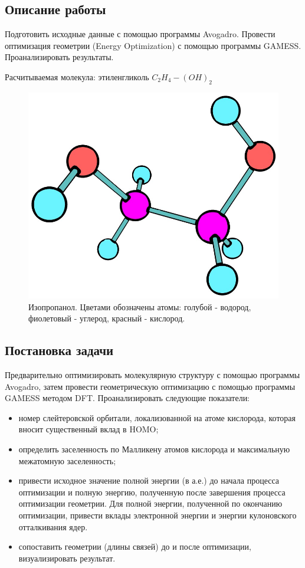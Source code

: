 \subsection{Описание работы}
Подготовить исходные данные с помощью программы Avogadro. Провести оптимизация геометрии (Energy Optimization) с помощью программы GAMESS. Проанализировать результаты.

Расчитываемая молекула: этиленгликоль $C_2H_4 - (OH)_2$

\begin{figure}[H]
\centering
\captionsetup{justification=centering}
\includegraphics[scale=0.4]{fig/0.jpg}
\caption{Изопропанол. Цветами обозначены атомы: голубой - водород, фиолетовый - углерод, красный - кислород.}
\end{figure}


\subsection{Постановка задачи}
Предварительно оптимизировать молекулярную структуру с помощью программы Avogadro, затем провести геометрическую оптимизацию с помощью программы GAMESS методом DFT. Проанализировать следующие показатели: 
\begin{itemize}
    \item номер слейтеровской орбитали, локализованной на атоме кислорода, которая вносит существенный вклад в HOMO;
    \item определить заселенность по Малликену атомов кислорода и максимальную межатомную заселенность;
    \item привести исходное значение полной энергии (в а.е.) до начала процесса оптимизации и полную энергию, полученную после завершения процесса оптимизации геометрии. Для полной энергии, полученной по окончанию оптимизации, привести вклады электронной энергии и энергии кулоновского отталкивания ядер.
    \item сопоставить геометрии (длины связей) до и после оптимизации, визуализировать результат.
\end{itemize}


